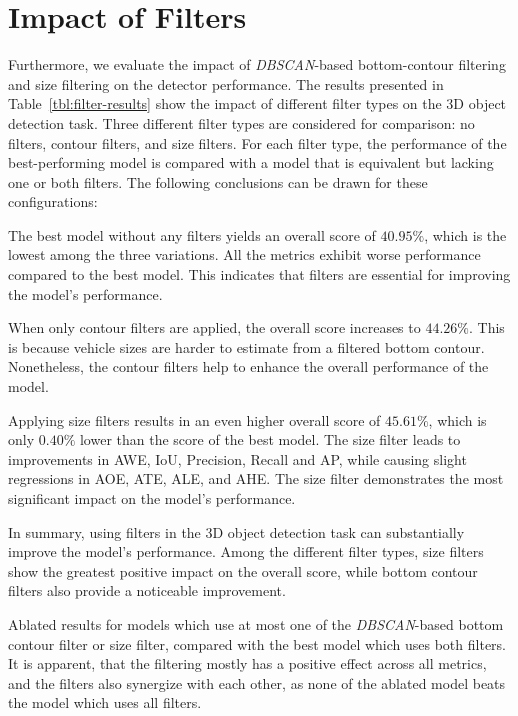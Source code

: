 \section{Impact of Filters}
\label{sec:impactcontourfiltering}

Furthermore, we evaluate the impact of \textit{DBSCAN}-based bottom-contour filtering and size filtering on the detector performance.
The results presented in Table~\ref{tbl:filter-results} show the impact of different filter types on the 3D object detection task.
Three different filter types are considered for comparison: no filters, contour filters, and size filters.
For each filter type, the performance of the best-performing model is compared with a model that is equivalent but lacking one or both filters.
The following conclusions can be drawn for these configurations:

The best model without any filters yields an overall score of $40.95\%$, which is the lowest among the three variations.
All the metrics exhibit worse performance compared to the best model.
This indicates that filters are essential for improving the model's performance.

When only contour filters are applied, the overall score increases to $44.26\%$.
This is because vehicle sizes are harder to estimate from a filtered bottom contour.
Nonetheless, the contour filters help to enhance the overall performance of the model.

Applying size filters results in an even higher overall score of $45.61\%$, which is only $0.40\%$ lower than the score of the best model.
The size filter leads to improvements in AWE, IoU, Precision, Recall and AP, while causing slight regressions in AOE, ATE, ALE, and AHE.
The size filter demonstrates the most significant impact on the model's performance.

In summary, using filters in the 3D object detection task can substantially improve the model's performance.
Among the different filter types, size filters show the greatest positive impact on the overall score, while bottom contour filters also provide a noticeable improvement.

\begin{table}[h!]
    
    \caption{Ablated results for models which use at most one of the \textit{DBSCAN}-based bottom contour filter or size filter, compared with the best model which uses both filters. It is apparent, that the filtering mostly has a positive effect across all metrics, and the filters also synergize with each other, as none of the ablated model beats the model which uses all filters.}
    \label{tbl:filter-results}
\end{table}

